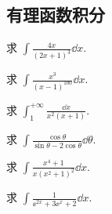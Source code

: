 \subsection{有理函数积分}

	\begin{ti}
		求 $\int \frac{4x}{(2x + 1)^{3}} \dd{x}$.
	\end{ti}

	\begin{ti}
		求 $\int \frac{x^{3}}{(x - 1)^{100}} \dd{x}$.
	\end{ti}

	\begin{ti}
		求 $\int_{1}^{+\infty} \frac{\dd{x}}{x^{2} (x + 1)}$.
	\end{ti}

	\begin{ti}
		求 $\int \frac{\cos\theta}{\sin\theta - 2 \cos\theta} \dd{\theta}$.
	\end{ti}

	\begin{ti}
		求 $\int \frac{x^{4} + 1}{x \left( x^{2} + 1 \right)^{2}} \dd{x}$.
	\end{ti}

	\begin{ti}
		求 $\int \frac{1}{\ee^{2x} + 3\ee^{x} + 2} \dd{x}$.
	\end{ti}